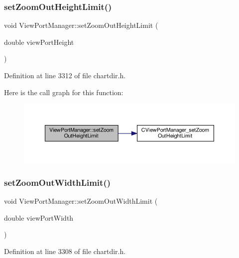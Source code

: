\subsubsection{\texorpdfstring{set\+Zoom\+Out\+Height\+Limit()}{setZoomOutHeightLimit()}}
{\footnotesize\ttfamily void View\+Port\+Manager\+::set\+Zoom\+Out\+Height\+Limit (\begin{DoxyParamCaption}\item[{double}]{view\+Port\+Height }\end{DoxyParamCaption})\hspace{0.3cm}{\ttfamily [inline]}}



Definition at line 3312 of file chartdir.\+h.

Here is the call graph for this function\+:
\nopagebreak
\begin{figure}[H]
\begin{center}
\leavevmode
\includegraphics[width=350pt]{class_view_port_manager_a050d927a278c1c37dc97ea2ccb00ca17_cgraph}
\end{center}
\end{figure}
\mbox{\label{class_view_port_manager_a05ecf60e99e7ccbc9f84061485d07543}} 
\subsubsection{\texorpdfstring{set\+Zoom\+Out\+Width\+Limit()}{setZoomOutWidthLimit()}}
{\footnotesize\ttfamily void View\+Port\+Manager\+::set\+Zoom\+Out\+Width\+Limit (\begin{DoxyParamCaption}\item[{double}]{view\+Port\+Width }\end{DoxyParamCaption})\hspace{0.3cm}{\ttfamily [inline]}}



Definition at line 3308 of file chartdir.\+h.


